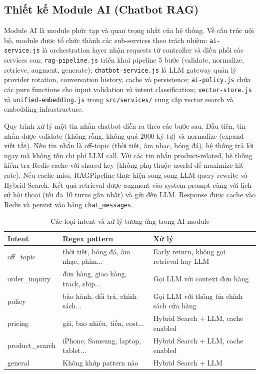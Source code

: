 \subsection{Thiết kế Module AI (Chatbot RAG)}

Module AI là module phức tạp và quan trọng nhất của hệ thống. Về cấu trúc nội bộ, module được tổ chức thành các sub-services theo trách nhiệm: \texttt{ai-service.js} là orchestration layer nhận requests từ controller và điều phối các services con; \texttt{rag-pipeline.js} triển khai pipeline 5 bước (validate, normalize, retrieve, augment, generate); \texttt{chatbot-service.js} là LLM gateway quản lý provider rotation, conversation history, cache và persistence; \texttt{ai-policy.js} chứa các pure functions cho input validation và intent classification; \texttt{vector-store.js} và \texttt{unified-embedding.js} trong \texttt{src/services/} cung cấp vector search và embedding infrastructure.

Quy trình xử lý một tin nhắn chatbot diễn ra theo các bước sau. Đầu tiên, tin nhắn được validate (không rỗng, không quá 2000 ký tự) và normalize (expand viết tắt). Nếu tin nhắn là off-topic (thời tiết, âm nhạc, bóng đá), hệ thống trả lời ngay mà không tốn chi phí LLM call. Với các tin nhắn product-related, hệ thống kiểm tra Redis cache với shared key (không phụ thuộc userId để maximize hit rate). Nếu cache miss, RAGPipeline thực hiện song song LLM query rewrite và Hybrid Search. Kết quả retrieval được augment vào system prompt cùng với lịch sử hội thoại (tối đa 10 turns gần nhất) và gửi đến LLM. Response được cache vào Redis và persist vào bảng \texttt{chat\_messages}.

\begin{table}[H]
\centering
\caption{Các loại intent và xử lý tương ứng trong AI module}
\begin{tabular}{|l|l|p{6cm}|}
\hline
\textbf{Intent} & \textbf{Regex pattern} & \textbf{Xử lý} \\
\hline
off\_topic & thời tiết, bóng đá, âm nhạc, phim... & Early return, không gọi retrieval hay LLM \\
\hline
order\_inquiry & đơn hàng, giao hàng, track, ship... & Gọi LLM với context đơn hàng \\
\hline
policy & bảo hành, đổi trả, chính sách... & Gọi LLM với thông tin chính sách cửa hàng \\
\hline
pricing & giá, bao nhiêu, tiền, cost... & Hybrid Search + LLM, cache enabled \\
\hline
product\_search & iPhone, Samsung, laptop, tablet... & Hybrid Search + LLM, cache enabled \\
\hline
general & Không khớp pattern nào & Hybrid Search + LLM \\
\hline
\end{tabular}
\end{table}

